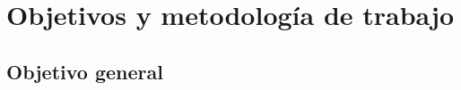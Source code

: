 \chapter{Objetivos y metodología de trabajo}
\label{cap:objetivos}

%
%

\section{Objetivo general}
\label{sec:objetivo_general}
%
%

